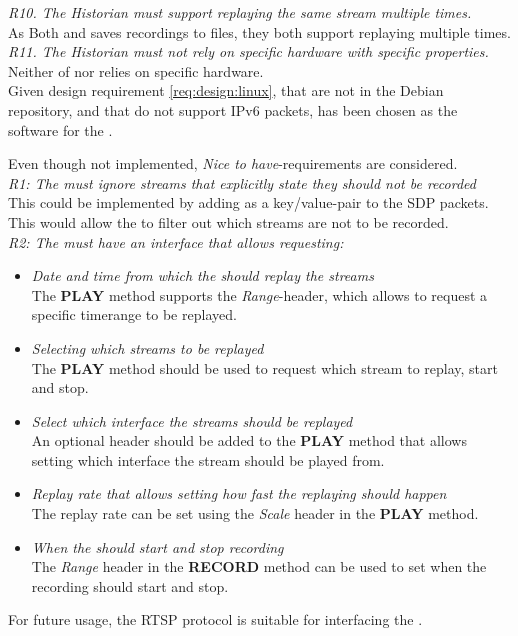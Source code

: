 \noindent{}\textit{R10. The Historian must support replaying the same stream multiple times.}\\
As Both  and  saves recordings to files, they both support replaying multiple times.\\

\noindent{}\textit{R11. The Historian must not rely on specific hardware with specific properties.}\\
Neither of  nor  relies on specific hardware.\\


\noindent{}Given design requirement \ref{req:design:linux}, that  are not in the Debian repository, and that  do not support IPv6 packets,  has been chosen as the software for the .\\

Even though not implemented, \textit{Nice to have}-requirements are considered.\\
\noindent{}\textit{R1: The  must ignore streams that explicitly state they should not be recorded}\\
This could be implemented by adding as a key/value-pair to the SDP packets. This would allow the \hist{} to filter out which streams are not to be recorded.\\

\noindent\textit{R2: The  must have an interface that allows requesting:}\\
\begin{itemize}
	\item \textit{Date and time from which the  should replay the streams} \\
	The \textbf{PLAY} method supports the \textit{Range}-header, which allows to request a specific timerange to be replayed.
	\item \textit{Selecting which streams to be replayed}\\
	The \textbf{PLAY} method should be used to request which stream to replay, start and stop.
	\item \textit{Select which interface the streams should be replayed}\\
	An optional header should be added to the \textbf{PLAY} method that allows setting which interface the stream should be played from.
	\item \textit{Replay rate that allows setting how fast the replaying should happen}\\
	The replay rate can be set using the \textit{Scale} header in the \textbf{PLAY} method.
	\item \textit{When the  should start and stop recording}\\
	The \textit{Range} header in the \textbf{RECORD} method can be used to set when the recording should start and stop.
\end{itemize}
For future usage, the RTSP protocol is suitable for interfacing the \hist{}.\\


